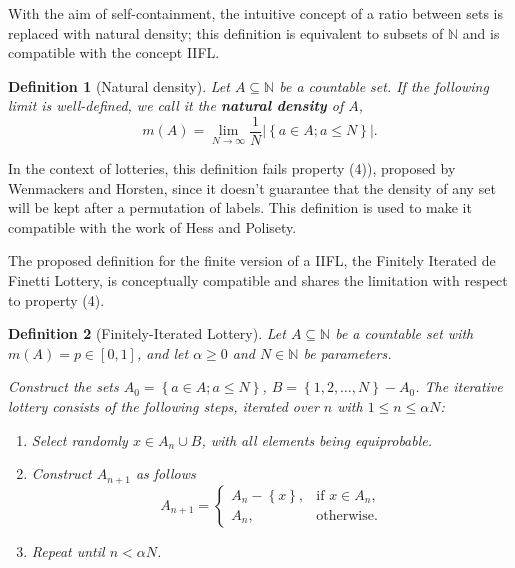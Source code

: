 \documentclass{article}
\newtheorem{definition}{Definition}
\newcommand{\N}{\mathbb{N}}
\newcommand{\card}[1]{\left| #1 \right|}
\newcommand{\sset}[1]{\left\{ #1 \right\}}
\newcommand{\ppar}[1]{\left( #1 \right)}
\begin{document}
With the aim of self-containment, the intuitive concept of a ratio between sets is replaced with natural density; this definition is equivalent to subsets of $\N$ and is compatible with the concept IIFL.

\begin{definition}[Natural density]
Let $A \subseteq \N$ be a countable set.
If the following limit is well-defined, we call it the \textbf{natural density} of $A$,
\begin{equation}
    m\ppar{A} = 
    \lim_{N\rightarrow \infty} \frac{1}{N} \card{ \sset{a\in A; a\leq N} }.
\end{equation}
\end{definition}

In the context of lotteries, this definition fails property (4)), proposed by Wenmackers and Horsten, since it doesn't guarantee that the density of any set will be kept after a permutation of labels.
%
This definition is used to make it compatible with the work of Hess and Polisety.

The proposed definition for the finite version of a IIFL, the Finitely Iterated de Finetti Lottery, is conceptually compatible and shares the limitation with respect to property (4).

\begin{definition}[Finitely-Iterated Lottery]
Let $A \subseteq \N$ be a countable set with $m\ppar{A} = p \in [0,1]$, and let $\alpha\geq 0$ and $N\in \N$ be parameters. 

Construct the sets $A_0 = \sset{a\in A; a\leq N}$, $B = \sset{1, 2, \dots, N} - A_0$.
%
The iterative lottery consists of the following steps, iterated over $n$ with $1\leq n\leq \alpha N$:
\begin{enumerate}
    \item Select randomly $x \in A_n \cup B$, with all elements being equiprobable.
    \item Construct $A_{n+1}$ as follows
    \begin{equation}
        A_{n+1} = \begin{cases}
            A_n-\sset{x}, &\text{if } x\in A_n, \\
            A_n, &\text{otherwise}.
        \end{cases}
    \end{equation}
    \item Repeat until $n< \alpha N$.
\end{enumerate}
\end{definition}
\end{document}
